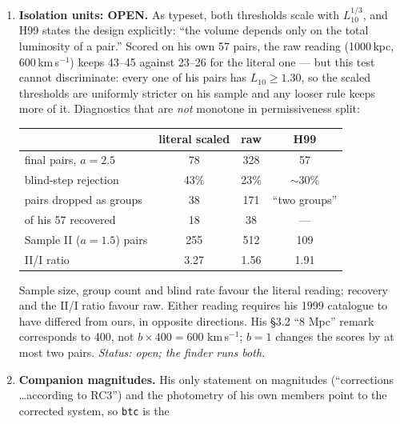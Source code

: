 \documentclass[11pt]{article}
\begin{document}
\begin{enumerate}
        example of a projected foreground/background galaxy. Known-redshift
        galaxies outside the shell are not sample members and are ignored
        (treating them as blind blockers keeps 38 of 57 rather than 43).
        \emph{Status: settled, but by the ``volume'' sentence, not by the
        printed criterion.}
  \item \textbf{Isolation units: OPEN.} As typeset, both thresholds scale
        with $L_{10}^{1/3}$, and H99 states the design explicitly: ``the
        volume depends only on the total luminosity of a pair.'' Scored on
        his own 57 pairs, the raw reading (1000\,kpc, 600\,km\,s$^{-1}$)
        keeps 43--45 against 23--26 for the literal one --- but this test
        cannot discriminate: every one of his pairs has $L_{10} \ge 1.30$, so
        the scaled thresholds are uniformly stricter on his sample and any
        looser rule keeps more of it. Diagnostics that are \emph{not} monotone
        in permissiveness split:
        \begin{center}
        \begin{tabular}{lccc}
        \toprule
        & literal scaled & raw & H99 \\
        \midrule
        final pairs, $a=2.5$ & 78 & 328 & 57 \\
        blind-step rejection & 43\% & 23\% & $\sim$30\% \\
        pairs dropped as groups & 38 & 171 & ``two groups'' \\
        of his 57 recovered & 18 & 38 & --- \\
        Sample II ($a=1.5$) pairs & 255 & 512 & 109 \\
        II/I ratio & 3.27 & 1.56 & 1.91 \\
        \bottomrule
        \end{tabular}
        \end{center}
        Sample size, group count and blind rate favour the literal reading;
        recovery and the II/I ratio favour raw. Either reading requires his
        1999 catalogue to have differed from ours, in opposite directions.
        His \S3.2 ``8 Mpc'' remark corresponds to 400, not $b\times400 = 600$
        km\,s$^{-1}$; $b = 1$ changes the scores by at most two pairs.
        \emph{Status: open; the finder runs both.}
  \item \textbf{Companion magnitudes.} His only statement on magnitudes
        (``corrections \ldots according to RC3'') and the photometry of his
        own members point to the corrected system, so \texttt{btc} is the

\end{enumerate}
\end{document}
